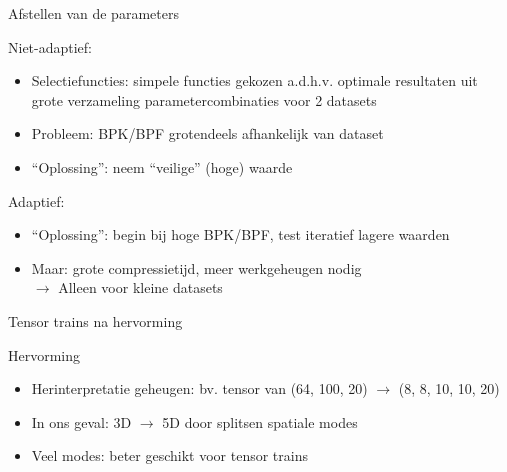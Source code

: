 \documentclass[t,12pt,dutch
\ifx\beamermode\undefined\else,\beamermode\fi
]{beamer}
\begin{document}
\begin{frame}{Afstellen van de parameters}

Niet-adaptief:
\begin{itemize}
\item Selectiefuncties: simpele functies gekozen a.d.h.v. optimale resultaten uit grote verzameling parametercombinaties voor 2 datasets
\item Probleem: BPK/BPF grotendeels afhankelijk van dataset
\item ``Oplossing'': neem ``veilige'' (hoge) waarde
\end{itemize}

Adaptief:
\begin{itemize}
\item ``Oplossing'': begin bij hoge BPK/BPF, test iteratief lagere waarden
\item Maar: grote compressietijd, meer werkgeheugen nodig\\
$\rightarrow$ Alleen voor kleine datasets
\end{itemize}

\end{frame}


\begin{frame}{}
\begin{center}
\vspace*{\fill}
\vspace*{\fill}
\Huge
Tensor trains na hervorming
\normalsize
\vspace*{\fill}
\end{center}
\end{frame}

\begin{frame}{Hervorming}

\begin{itemize}
\item Herinterpretatie geheugen: bv. tensor van (64, 100, 20) $\rightarrow$ (8, 8, 10, 10, 20)
\item In ons geval: 3D $\rightarrow$ 5D door splitsen spatiale modes
\item Veel modes: beter geschikt voor tensor trains
\end{itemize}

\end{frame}
\end{document}
